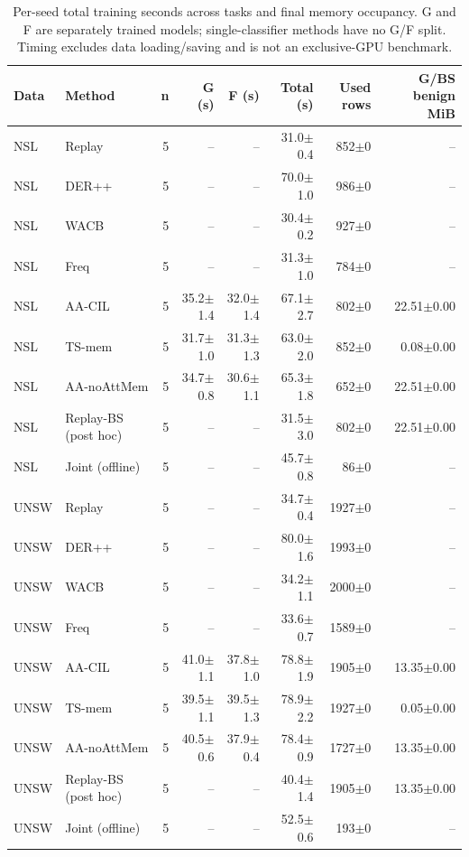 \begin{table}[t]
\centering\scriptsize
\setlength{\tabcolsep}{3.8pt}
\caption{Per-seed total training seconds across tasks and final memory occupancy. G and F are separately trained models; single-classifier methods have no G/F split. Timing excludes data loading/saving and is not an exclusive-GPU benchmark.}\label{tab:costs}
\begin{tabular}{llrrrrrr}
\toprule
Data & Method & n & G (s) & F (s) & Total (s) & Used rows & G/BS benign MiB \\
\midrule
NSL & Replay & 5 & -- & -- & 31.0$\pm$0.4 & 852$\pm$0 & -- \\
NSL & DER++ & 5 & -- & -- & 70.0$\pm$1.0 & 986$\pm$0 & -- \\
NSL & WACB & 5 & -- & -- & 30.4$\pm$0.2 & 927$\pm$0 & -- \\
NSL & Freq & 5 & -- & -- & 31.3$\pm$1.0 & 784$\pm$0 & -- \\
NSL & AA-CIL & 5 & 35.2$\pm$1.4 & 32.0$\pm$1.4 & 67.1$\pm$2.7 & 802$\pm$0 & 22.51$\pm$0.00 \\
NSL & TS-mem & 5 & 31.7$\pm$1.0 & 31.3$\pm$1.3 & 63.0$\pm$2.0 & 852$\pm$0 & 0.08$\pm$0.00 \\
NSL & AA-noAttMem & 5 & 34.7$\pm$0.8 & 30.6$\pm$1.1 & 65.3$\pm$1.8 & 652$\pm$0 & 22.51$\pm$0.00 \\
NSL & Replay-BS (post hoc) & 5 & -- & -- & 31.5$\pm$3.0 & 802$\pm$0 & 22.51$\pm$0.00 \\
NSL & Joint (offline) & 5 & -- & -- & 45.7$\pm$0.8 & 86$\pm$0 & -- \\
UNSW & Replay & 5 & -- & -- & 34.7$\pm$0.4 & 1927$\pm$0 & -- \\
UNSW & DER++ & 5 & -- & -- & 80.0$\pm$1.6 & 1993$\pm$0 & -- \\
UNSW & WACB & 5 & -- & -- & 34.2$\pm$1.1 & 2000$\pm$0 & -- \\
UNSW & Freq & 5 & -- & -- & 33.6$\pm$0.7 & 1589$\pm$0 & -- \\
UNSW & AA-CIL & 5 & 41.0$\pm$1.1 & 37.8$\pm$1.0 & 78.8$\pm$1.9 & 1905$\pm$0 & 13.35$\pm$0.00 \\
UNSW & TS-mem & 5 & 39.5$\pm$1.1 & 39.5$\pm$1.3 & 78.9$\pm$2.2 & 1927$\pm$0 & 0.05$\pm$0.00 \\
UNSW & AA-noAttMem & 5 & 40.5$\pm$0.6 & 37.9$\pm$0.4 & 78.4$\pm$0.9 & 1727$\pm$0 & 13.35$\pm$0.00 \\
UNSW & Replay-BS (post hoc) & 5 & -- & -- & 40.4$\pm$1.4 & 1905$\pm$0 & 13.35$\pm$0.00 \\
UNSW & Joint (offline) & 5 & -- & -- & 52.5$\pm$0.6 & 193$\pm$0 & -- \\

\end{tabular}
\end{table}
